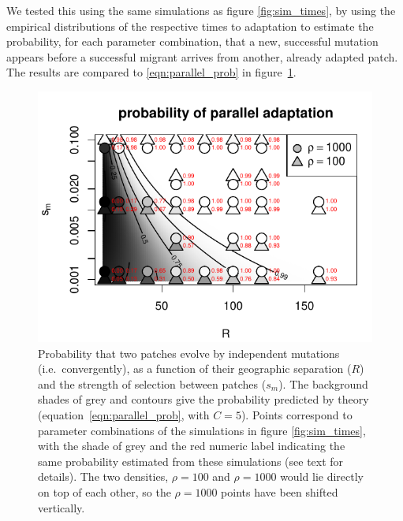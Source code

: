 \documentclass{article}
\begin{document}
We tested this using the same simulations as figure \ref{fig:sim_times},
by using the empirical distributions of the respective times to adaptation
to estimate the probability,
for each parameter combination,
that a new, successful mutation appears 
before a successful migrant arrives from another, already adapted patch.
The results are compared to \eqref{eqn:parallel_prob}
in figure~\ref{fig:sim_probs}.


\begin{figure}[ht!]
  \begin{center}
      \includegraphics{prob-mutation-compared}
  \end{center}
  \caption{
      Probability that two patches 
      evolve by independent mutations (i.e.\ convergently),
      as a function of their geographic separation ($R$)
      and the strength of selection between patches ($s_m$).
      The background shades of grey and contours
      give the probability predicted by theory (equation~\eqref{eqn:parallel_prob}, with $C=5$).
      Points correspond to parameter combinations of the simulations in figure \ref{fig:sim_times},
      with the shade of grey and the red numeric label indicating the same probability
      estimated from these simulations (see text for details).
      The two densities, $\rho=100$ and $\rho=1000$ would lie directly on top of each other, so the $\rho=1000$ points have been shifted vertically.
  }   \label{fig:sim_probs}
\end{figure}

\end{document}

